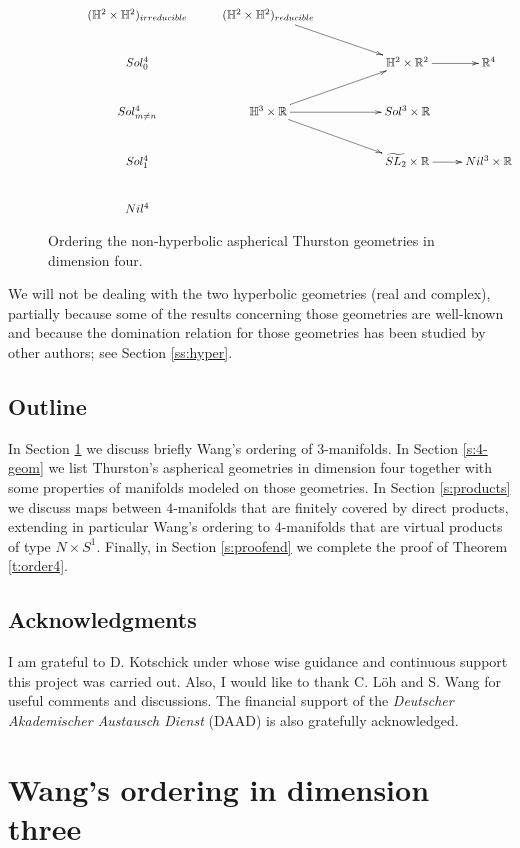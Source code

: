 \documentclass[12pt]{amsart}
\theoremstyle{remark}
\begin{document}
\begin{figure}[ht!]
    \[
\xymatrix{
 &(\mathbb{H}^2 \times \mathbb{H}^2)_{irreducible}  & (\mathbb{H}^2 \times \mathbb{H}^2)_{reducible} \ar[rrd]& & & \\
& Sol_0^4 &   &                                       &  \mathbb{H}^2 \times {\mathbb{R}}^2 \ar[r] & {\mathbb{R}}^4\\
&Sol_{m\neq n}^4 & 
 \mathbb{H}^3 \times {\mathbb{R}} \ar[rr] \ar[rru] \ar[rrd] & & Sol^3
\times {\mathbb{R}} & &\\
&Sol_1^4 & & & \widetilde{SL_2} \times {\mathbb{R}} \ar[r] & Nil^3 \times {\mathbb{R}}\\
 & Nil^4  &  & & &}
\] 
\caption{\small{Ordering the non-hyperbolic aspherical Thurston geometries in dimension four.}}
\label{d:nonhypmaps}
\end{figure} 

We will not be dealing with the two hyperbolic geometries (real and complex), partially because some of the results concerning those geometries are well-known and because the domination relation for those geometries has been studied by other authors; see Section \ref{ss:hyper}.

\subsection*{Outline} 
In Section \ref{s:Wang} we discuss briefly Wang's ordering of $3$-manifolds. In Section \ref{s:4-geom} we list Thurston's aspherical geometries in dimension four together with some properties of manifolds modeled on those geometries. In Section \ref{s:products} we discuss maps between $4$-manifolds that are finitely covered by direct products, extending in particular Wang's ordering to $4$-manifolds that are virtual products of type $N\times S^1$.  
Finally, in Section \ref{s:proofend} we complete the proof of Theorem \ref{t:order4}.

\subsection*{Acknowledgments} 
I am grateful to D. Kotschick under whose wise guidance and continuous support this project was carried out. Also, I would like to thank C. L\"oh and S. Wang for useful comments and discussions. 
The financial support of the {\em Deutscher Akademischer Austausch Dienst} (DAAD) is also gratefully acknowledged. 

\section{Wang's ordering in dimension three}\label{s:Wang}
\end{document}
